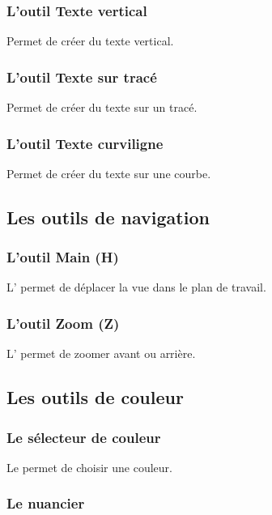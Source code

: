 \subsubsection{L'outil Texte vertical}

Permet de créer du texte vertical.

\subsubsection{L'outil Texte sur tracé}

Permet de créer du texte sur un tracé.

\subsubsection{L'outil Texte curviligne}

Permet de créer du texte sur une courbe.

\subsection{Les outils de navigation}

\subsubsection{L'outil Main (H)}

L' permet de déplacer la vue dans le plan de travail.

\subsubsection{L'outil Zoom (Z)}

L' permet de zoomer avant ou arrière.

\subsection{Les outils de couleur}

\subsubsection{Le sélecteur de couleur}

Le  permet de choisir une couleur.

\subsubsection{Le nuancier}

